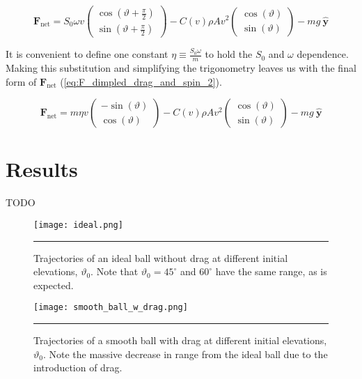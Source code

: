 \documentclass[notitlepage,aps,prd,nofootinbib]{revtex4-1}
\begin{document}
\begin{equation} \label{eq:F_dimpled_drag_and_spin}
\mathbf{F}_{\text{net}} = S_{0} \omega v 
\begin{pmatrix}
  \cos(\vartheta + \frac{\pi}{2}) \\
  \sin(\vartheta + \frac{\pi}{2})
\end{pmatrix}
- C\left(v\right) \rho A v^{2}
\begin{pmatrix}
  \cos(\vartheta) \\
  \sin(\vartheta)
\end{pmatrix}
-m g~\hat{\mathbf{y}}
\end{equation}

It is convenient to define one constant $\eta \equiv \frac{S_{0} \omega}{m}$ to hold the $S_{0}$ and $\omega$ dependence. Making this substitution and simplifying the trigonometry leaves us with the final form of $\mathbf{F}_{\text{net}}$ (\ref{eq:F_dimpled_drag_and_spin_2}). 

\begin{equation} \label{eq:F_dimpled_drag_and_spin_2}
\mathbf{F}_{\text{net}} = m \eta v 
\begin{pmatrix}
  -\sin(\vartheta) \\
  \cos(\vartheta)
\end{pmatrix}
- C\left(v\right) \rho A v^{2}
\begin{pmatrix}
  \cos(\vartheta) \\
  \sin(\vartheta)
\end{pmatrix}
-m g~\hat{\mathbf{y}}
\end{equation}


\section{Results}
\label{sec:results}
TODO

\begin{figure}[!htbc]
  \centering
  \texttt{[image: ideal.png]}
	{\par\nobreak\rule[9pt]{35em}{0.5pt}\vspace{-5mm}}
	\caption{Trajectories of an ideal ball without drag at different initial elevations, $\vartheta_{0}$. Note that $\vartheta_{0} = 45^{\circ}$ and $60^{\circ}$ have the same range, as is expected.}
	\label{fig:ideal}
\end{figure}

\begin{figure}[!htbc]
  \centering
  \texttt{[image: smooth\_ball\_w\_drag.png]}
	{\par\nobreak\rule[9pt]{35em}{0.5pt}\vspace{-5mm}}
	\caption{Trajectories of a smooth ball with drag at different initial elevations, $\vartheta_{0}$. Note the massive decrease in range from the ideal ball due to the introduction of drag.}
	\label{fig:smooth_ball_w_drag}
\end{figure}
\end{document}
